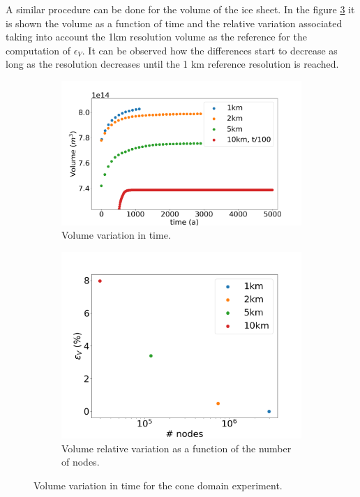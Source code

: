 \documentclass{article}
\begin{document}
A similar procedure can be done for the volume of the ice sheet. In the figure \ref{Volume_CONE_VS_TIME_VS_NODES} it is shown the volume as a function of time and the relative variation associated taking into account the 1km resolution volume as the reference for the computation of $\epsilon_V$. It can be observed how the differences start to decrease as long as the resolution decreases until the 1 km reference resolution is reached. 

\begin{figure}[!h]
	\centering
	\begin{subfigure}{.5\textwidth}
		\centering
		\includegraphics[width=1.1\linewidth]{../fig/Volume_CONE_full_all_res_vs_time.png}
		\caption{Volume variation in time.}
		\label{VOLUME_CONE_VS_TIME}
	\end{subfigure}%
	\begin{subfigure}{.5\textwidth}
		\centering
		\includegraphics[width=1.1\linewidth]{../fig/Volume_CONE_full_all_res_vs_num_nodes.png}
		\caption{Volume relative variation as a function of the number of nodes.}
		\label{VOLUME_CONE_VS_NODES}
	\end{subfigure}
	\caption{Volume variation in time for the cone domain experiment.}
	\label{Volume_CONE_VS_TIME_VS_NODES}
\end{figure}
\end{document}
